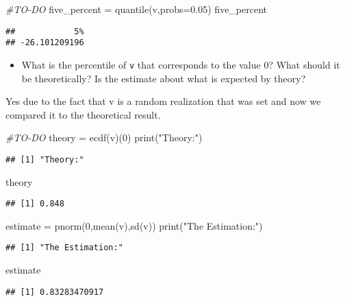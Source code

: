 \documentclass[
]{article}
\newenvironment{Shaded}{\begin{snugshade}}{\end{snugshade}}
\newcommand{\AttributeTok}[1]{\textcolor[rgb]{0.77,0.63,0.00}{#1}}
\newcommand{\CommentTok}[1]{\textcolor[rgb]{0.56,0.35,0.01}{\textit{#1}}}
\newcommand{\DecValTok}[1]{\textcolor[rgb]{0.00,0.00,0.81}{#1}}
\newcommand{\FloatTok}[1]{\textcolor[rgb]{0.00,0.00,0.81}{#1}}
\newcommand{\FunctionTok}[1]{\textcolor[rgb]{0.00,0.00,0.00}{#1}}
\newcommand{\NormalTok}[1]{#1}
\newcommand{\OtherTok}[1]{\textcolor[rgb]{0.56,0.35,0.01}{#1}}
\newcommand{\StringTok}[1]{\textcolor[rgb]{0.31,0.60,0.02}{#1}}
\providecommand{\tightlist}{%
  \setlength{\itemsep}{0pt}\setlength{\parskip}{0pt}}
\begin{document}
\begin{Shaded}
\begin{Highlighting}[]
\CommentTok{\#TO{-}DO}
\NormalTok{five\_percent }\OtherTok{=} \FunctionTok{quantile}\NormalTok{(v,}\AttributeTok{probs=}\FloatTok{0.05}\NormalTok{)}
\NormalTok{five\_percent}
\end{Highlighting}
\end{Shaded}

\begin{verbatim}
##            5% 
## -26.101209196
\end{verbatim}

\begin{itemize}
\tightlist
\item
  What is the percentile of \texttt{v} that corresponds to the value 0?
  What should it be theoretically? Is the estimate about what is
  expected by theory?
\end{itemize}

Yes due to the fact that v is a random realization that was set and now
we compared it to the theoretical result.

\begin{Shaded}
\begin{Highlighting}[]
\CommentTok{\#TO{-}DO}
\NormalTok{theory }\OtherTok{=} \FunctionTok{ecdf}\NormalTok{(v)(}\DecValTok{0}\NormalTok{)}
\FunctionTok{print}\NormalTok{(}\StringTok{"Theory:"}\NormalTok{)}
\end{Highlighting}
\end{Shaded}

\begin{verbatim}
## [1] "Theory:"
\end{verbatim}

\begin{Shaded}
\begin{Highlighting}[]
\NormalTok{theory}
\end{Highlighting}
\end{Shaded}

\begin{verbatim}
## [1] 0.848
\end{verbatim}

\begin{Shaded}
\begin{Highlighting}[]
\NormalTok{estimate }\OtherTok{=} \FunctionTok{pnorm}\NormalTok{(}\DecValTok{0}\NormalTok{,}\FunctionTok{mean}\NormalTok{(v),}\FunctionTok{sd}\NormalTok{(v))}
\FunctionTok{print}\NormalTok{(}\StringTok{"The Estimation:"}\NormalTok{)}
\end{Highlighting}
\end{Shaded}

\begin{verbatim}
## [1] "The Estimation:"
\end{verbatim}

\begin{Shaded}
\begin{Highlighting}[]
\NormalTok{estimate}
\end{Highlighting}
\end{Shaded}

\begin{verbatim}
## [1] 0.83283470917
\end{verbatim}
\end{document}
